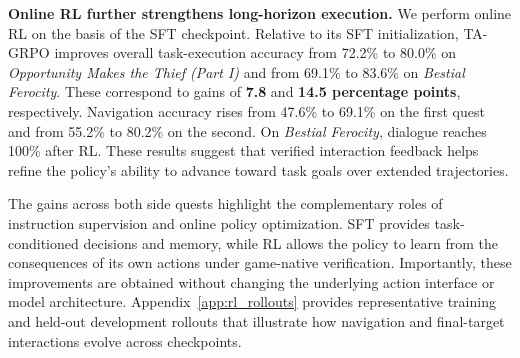 \textbf{Online RL further strengthens long-horizon execution.}
We perform online RL on the basis of the SFT checkpoint. Relative to its SFT initialization, TA-GRPO improves overall task-execution accuracy from 72.2\% to 80.0\% on \emph{Opportunity Makes the Thief (Part I)} and from 69.1\% to 83.6\% on \emph{Bestial Ferocity}. These correspond to gains of \textbf{7.8} and \textbf{14.5 percentage points}, respectively. Navigation accuracy rises from 47.6\% to 69.1\% on the first quest and from 55.2\% to 80.2\% on the second. On \emph{Bestial Ferocity}, dialogue reaches 100\% after RL. These results suggest that verified interaction feedback helps refine the policy's ability to advance toward task goals over extended trajectories.

The gains across both side quests highlight the complementary roles of instruction supervision and online policy optimization. SFT provides task-conditioned decisions and memory, while RL allows the policy to learn from the consequences of its own actions under game-native verification. Importantly, these improvements are obtained without changing the underlying action interface or model architecture. Appendix~\ref{app:rl_rollouts} provides representative training and held-out development rollouts that illustrate how navigation and final-target interactions evolve across checkpoints.


